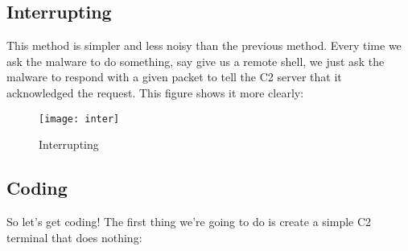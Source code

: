 \documentclass{article}
\begin{document}
\subsection{Interrupting}
This method is simpler and less noisy than the previous method. Every time we ask the malware to do something, say give us a remote shell, we just ask the malware to respond with a given packet to tell the C2 server that it acknowledged the request. This figure shows it more clearly:

\begin{figure}[h]
    \centering
    \texttt{[image: inter]}
    \caption{Interrupting}
    \label{fig:polling}
\end{figure}

\subsection{Coding}
So let's get coding! The first thing we're going to do is create a simple C2 terminal that does nothing:
\end{document}
